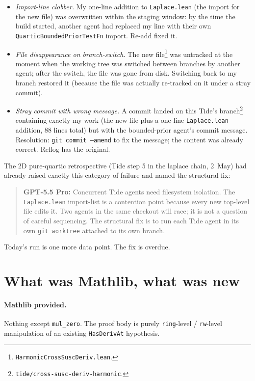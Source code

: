 \documentclass[11pt]{article}
\newcommand{\gptbox}[1]{\par\medskip\begin{quote}\small\textbf{\textcolor{green!50!black}{GPT-5.5 Pro:}} #1\end{quote}\medskip}
\begin{document}
\begin{itemize}
\item \emph{Import-line clobber.} My one-line addition to
\texttt{Laplace.lean} (the import for the new file) was overwritten
within the staging window: by the time the build started, another
agent had replaced my line with their own \texttt{QuarticBoundedPriorTestFn}
import. Re-add fixed it.
\item \emph{File disappearance on branch-switch.} The new
file\footnote{\texttt{HarmonicCrossSuscDeriv.lean}.} was untracked at
the moment when the working tree was switched between branches by
another agent; after the switch, the file was gone from disk.
Switching back to my branch restored it (because the file was
actually re-tracked on it under a stray commit).
\item \emph{Stray commit with wrong message.} A commit landed on
this Tide's branch\footnote{\texttt{tide/cross-susc-deriv-harmonic}.}
containing exactly my work (the new file plus a one-line
\texttt{Laplace.lean} addition, 88 lines total) but with the
bounded-prior agent's commit message. Resolution:
\texttt{git commit --amend} to fix the message; the content was
already correct. Reflog has the original.
\end{itemize}

The 2D pure-quartic retrospective (Tide step 5 in the laplace chain,
2~May) had already raised exactly this category of failure and named
the structural fix:

\gptbox{Concurrent Tide agents need filesystem isolation. The
\texttt{Laplace.lean} import-list is a contention point because every
new top-level file edits it. Two agents in the same checkout will
race; it is not a question of careful sequencing. The structural fix
is to run each Tide agent in its own \texttt{git worktree} attached
to its own branch.}

Today's run is one more data point. The fix is overdue.

\section{What was Mathlib, what was new}

\paragraph{Mathlib provided.} Nothing except \texttt{mul\_zero}. The
proof body is purely \texttt{ring}-level / \texttt{rw}-level
manipulation of an existing \texttt{HasDerivAt} hypothesis.
\end{document}

